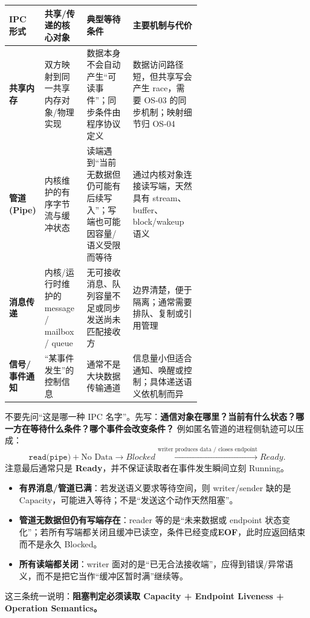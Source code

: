 \documentclass[11pt,a4paper]{ctexart}
\newcommand{\kw}[1]{\textbf{#1}}
\begin{document}
\begingroup
\small
\renewcommand{\arraystretch}{1.25}
\setlength{\tabcolsep}{4pt}
\begin{tabularx}{\linewidth}{>{\bfseries}p{0.17\linewidth} p{0.22\linewidth} p{0.24\linewidth} X}
\toprule
IPC 形式 & 共享/传递的核心对象 & 典型等待条件 & 主要机制与代价\\
\midrule
共享内存 & 双方映射到同一共享内存对象/物理实现 & 数据本身不会自动产生“可读事件”；同步条件由程序协议定义 & 数据访问路径短，但共享写会产生 race，需要 OS-03 的同步机制；映射细节归 OS-04\\
管道 (Pipe) & 内核维护的有序字节流与缓冲状态 & 读端遇到“当前无数据但仍可能有后续写入”；写端也可能因容量/语义受限而等待 & 通过内核对象连接读写端，天然具有 stream、buffer、block/wakeup 语义\\
消息传递 & 内核/运行时维护的 message / mailbox / queue & 无可接收消息、队列容量不足或同步发送尚未匹配接收方 & 边界清楚，便于隔离；通常需要排队、复制或引用管理\\
信号/事件通知 & “某事件发生”的控制信息 & 通常不是大块数据传输通道 & 信息量小但适合通知、唤醒或控制；具体递送语义依机制而异\\
\bottomrule
\end{tabularx}
\endgroup

\begin{exam}
不要先问“这是哪一种 IPC 名字”。先写：\kw{通信对象在哪里？当前有什么状态？哪一方在等待什么条件？哪个事件会改变条件？} 例如匿名管道的进程侧轨迹可以压成：
\[
\texttt{read(pipe)}+\text{No Data}
\rightarrow
Blocked
\xrightarrow{\text{writer produces data / closes endpoint}}
Ready.
\]
注意最后通常只是 \kw{Ready}，并不保证读取者在事件发生瞬间立刻 Running。
\end{exam}

\begin{exam}
\begin{itemize}
\item \kw{有界消息/管道已满}：若发送语义要求等待空间，则 writer/sender 缺的是 Capacity，可能进入等待；不是“发送这个动作天然阻塞”。
\item \kw{管道无数据但仍有写端存在}：reader 等的是“未来数据或 endpoint 状态变化”；若所有写端都关闭且缓冲已读空，条件已经变成\kw{EOF}，此时应返回结束而不是永久 Blocked。
\item \kw{所有读端都关闭}：writer 面对的是“已无合法接收端”，应得到错误/异常语义，而不是把它当作“缓冲区暂时满”继续等。
\end{itemize}
这三条统一说明：\kw{阻塞判定必须读取 Capacity + Endpoint Liveness + Operation Semantics。}
\end{exam}
\end{document}
